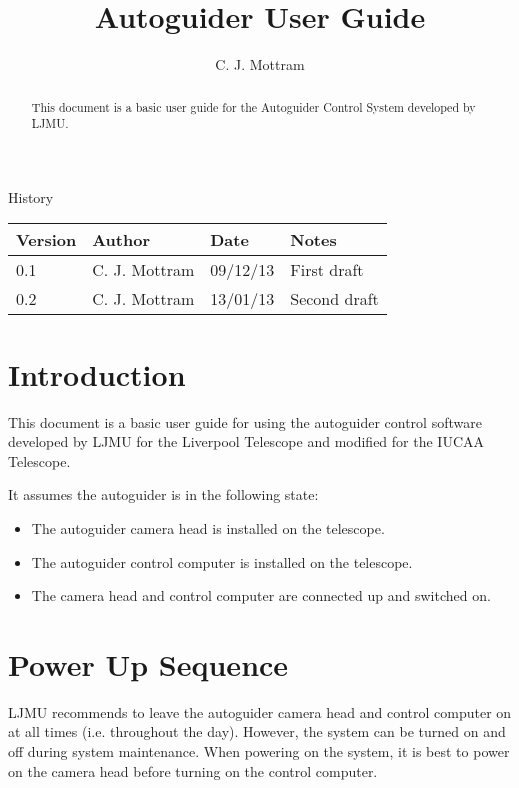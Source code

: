 \documentclass[10pt,a4paper]{article}
\title{Autoguider User Guide}
\author{C. J. Mottram}
\date{}
\begin{document}
\thispagestyle{empty}
\maketitle
\begin{abstract}
This document is a basic user guide for the Autoguider Control System developed by LJMU.
\end{abstract}
\centerline{\Large History}
\begin{center}
\begin{tabular}{|l|l|l|p{15em}|}
\hline
{\bf Version} & {\bf Author} & {\bf Date} & {\bf Notes} \\
\hline
0.1 & C. J. Mottram & 09/12/13 & First draft \\
0.2 & C. J. Mottram & 13/01/13 & Second draft \\
\hline
\end{tabular}
\end{center}

\newpage
\tableofcontents
\listoffigures
\listoftables
\newpage

\section{Introduction}
This document is a basic user guide for using the autoguider control software developed by LJMU for the 
Liverpool Telescope and modified for the IUCAA Telescope.

It assumes the autoguider is in the following state:

\begin{itemize}
\item The autoguider camera head is installed on the telescope.
\item The autoguider control computer is installed on the telescope.
\item The camera head and control computer are connected up and switched on.
\end{itemize}

\section{Power Up Sequence}

LJMU recommends to leave the autoguider camera head and control computer on at all times (i.e. throughout the day).
However, the system can be turned on and off during system maintenance. When powering on the system, it is best to
power on the camera head before turning on the control computer.
\end{document}
